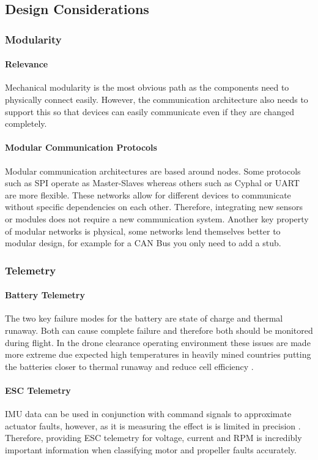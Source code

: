 \subsection{Design Considerations}

\subsubsection{Modularity}
\paragraph{Relevance}
Mechanical modularity is the most obvious path as the components need to physically connect easily. However, the communication architecture also needs to support this so that devices can easily communicate even if they are changed completely.
\paragraph{Modular Communication Protocols}
Modular communication architectures are based around nodes. Some protocols such as \gls{SPI} operate as Master-Slaves whereas others such as Cyphal or \gls{UART} are more flexible. These networks allow for different devices to communicate without specific dependencies on each other. Therefore, integrating new sensors or modules does not require a new communication system. Another key property of modular networks is physical, some networks lend themselves better to modular design, for example for a \gls{CAN} Bus you only need to add a stub.

\subsubsection{Telemetry}
\paragraph{Battery Telemetry}
The two key failure modes for the battery are state of charge and thermal runaway. Both can cause complete failure and therefore both should be monitored during flight. In the drone clearance operating environment these issues are made more extreme due expected high temperatures in heavily mined countries putting the batteries closer to thermal runaway and reduce cell efficiency \cite{REF}.
\paragraph{\gls{ESC} Telemetry}
\gls{IMU} data can be used in conjunction with command signals to approximate actuator faults, however, as it is measuring the effect is is limited in precision \cite{REF}. Therefore, providing \gls{ESC} telemetry for voltage, current and \gls{RPM} is incredibly important information when classifying motor and propeller faults accurately.   

